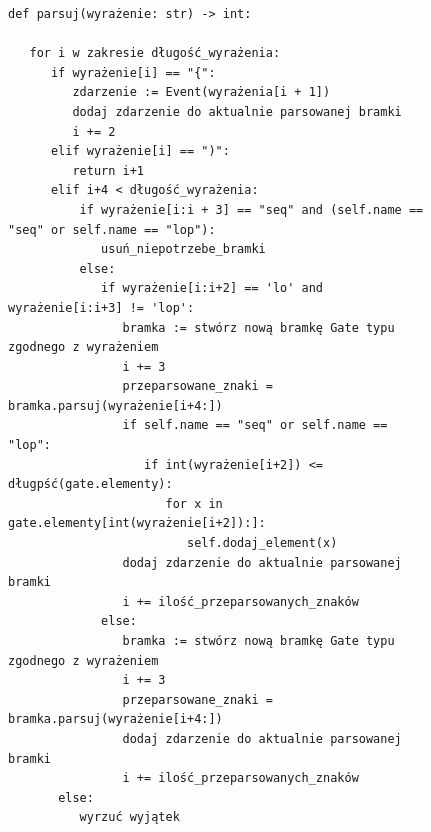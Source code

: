 \begin{figure}[!ht]
\lstset{caption=Parser gramatyki, captionpos=b}
\lstset{label=src:passive, frame=single}
\begin{lstlisting}[escapeinside=``]
def parsuj(wyrażenie: str) -> int:

   for i w zakresie długość_wyrażenia:
      if wyrażenie[i] == "{":
         zdarzenie := Event(wyrażenia[i + 1])
         dodaj zdarzenie do aktualnie parsowanej bramki 
         i += 2
      elif wyrażenie[i] == ")":
         return i+1
      elif i+4 < długość_wyrażenia:
          if wyrażenie[i:i + 3] == "seq" and (self.name == "seq" or self.name == "lop"):
             usuń_niepotrzebe_bramki
          else:
             if wyrażenie[i:i+2] == 'lo' and wyrażenie[i:i+3] != 'lop':  
                bramka := stwórz nową bramkę Gate typu zgodnego z wyrażeniem 
                i += 3
                przeparsowane_znaki = bramka.parsuj(wyrażenie[i+4:])
                if self.name == "seq" or self.name == "lop":
                   if int(wyrażenie[i+2]) <= długpść(gate.elementy):
                      for x in gate.elementy[int(wyrażenie[i+2]):]:
                         self.dodaj_element(x)
                dodaj zdarzenie do aktualnie parsowanej bramki 
                i += ilość_przeparsowanych_znaków
             else:
                bramka := stwórz nową bramkę Gate typu zgodnego z wyrażeniem 
                i += 3
                przeparsowane_znaki = bramka.parsuj(wyrażenie[i+4:])
                dodaj zdarzenie do aktualnie parsowanej bramki 
                i += ilość_przeparsowanych_znaków
       else:
          wyrzuć wyjątek
\end{lstlisting}
\end{figure}

